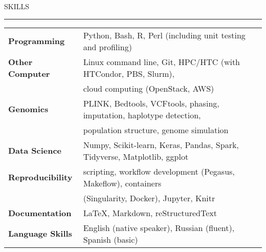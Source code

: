 \documentclass{resume} %
\renewenvironment{rSection}[1]{
\sectionskip
\textcolor{RoyalPurple}{\MakeUppercase{#1}}
\sectionlineskip
\hrule
\begin{list}{}{
\setlength{\leftmargin}{1.5em}
}
\item[]
}{
\end{list}
}
\begin{document}

\begin{rSection}{Skills}

\begin{tabular}{ @{} >{\bfseries}l @{\hspace{6ex}} l }
Programming & Python, Bash, R, Perl (including unit testing and profiling)\\
Other Computer & Linux command line, Git, HPC/HTC (with HTCondor, PBS, Slurm), \\ & cloud computing (OpenStack, AWS)  \\
Genomics & PLINK, Bedtools, VCFtools, phasing, imputation, haplotype detection, \\ & population structure, genome simulation\\
Data Science & Numpy, Scikit-learn, Keras, Pandas, Spark, Tidyverse, Matplotlib, ggplot\\
Reproducibility & scripting, workflow development (Pegasus, Makeflow), containers \\ & (Singularity, Docker), Jupyter, Knitr \\
Documentation & \LaTeX, Markdown, reStructuredText \\
Language Skills & English (native speaker), Russian (fluent), Spanish (basic) \\
\end{tabular}

\end{rSection}

\end{document}
